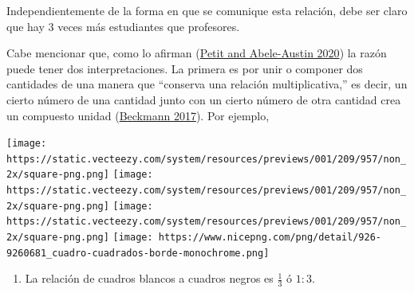 \documentclass[
  11pt,
]{book}
\providecommand{\tightlist}{%
  \setlength{\itemsep}{0pt}\setlength{\parskip}{0pt}}
\begin{document}
Independientemente de la forma en que se comunique esta relación, debe ser claro que hay 3 veces más estudiantes que profesores.

Cabe mencionar que, como lo afirman (\protect\hyperlink{ref-petit2020focus}{Petit and Abele-Austin 2020}) la razón puede tener dos interpretaciones. La primera es por
unir o componer dos cantidades de una manera que ``conserva una relación multiplicativa,'' es decir, un cierto número de una cantidad junto con un cierto número de otra cantidad crea un compuesto unidad (\protect\hyperlink{ref-beckmann2017mathematics}{Beckmann 2017}). Por ejemplo,

\texttt{[image: https://static.vecteezy.com/system/resources/previews/001/209/957/non\_2x/square-png.png]} \texttt{[image: https://static.vecteezy.com/system/resources/previews/001/209/957/non\_2x/square-png.png]} \texttt{[image: https://static.vecteezy.com/system/resources/previews/001/209/957/non\_2x/square-png.png]} \texttt{[image: https://www.nicepng.com/png/detail/926-9260681\_cuadro-cuadrados-borde-monochrome.png]}

\begin{enumerate}
\def\labelenumi{\arabic{enumi}.}
\tightlist
\item
  La relación de cuadros blancos a cuadros negros es \(\frac{1}{3}\) ó \(1:3\).
\end{enumerate}
\end{document}
